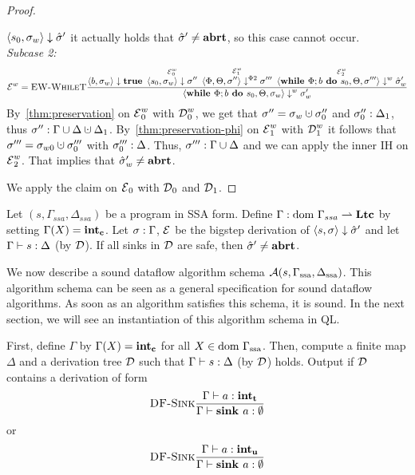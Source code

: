 \begin{proof}
\begin{claimproof}
        $\langle s_0, \sigma_w \rangle \downarrow \hat{\sigma}{}'$ it actually holds that $\hat{\sigma}{}' \neq \textbf{abrt}$,
        so this case cannot occur.\\
        \emph{Subcase 2:}
        \begin{align*}
            \operatorname{\mathcal{E}}^w = \textsc{EW-WhileT}\frac{\displaystyle \overset{}{\langle b, \sigma_w \rangle \downarrow \textbf{true}} \enskip
            \overset{\operatorname{\mathcal{E}}^w_0}{\langle s_0, \sigma_w \rangle \downarrow \sigma''} \enskip
            \overset{\operatorname{\mathcal{E}}^w_1}{\langle \Phi, \Theta, \sigma'' \rangle \downarrow^{\Phi2} \sigma'''} \enskip
            \overset{\operatorname{\mathcal{E}}^w_2}{\langle \textbf{while }\Phi;{b} \textbf{ do } {s_0}, \Theta, \sigma''' \rangle \downarrow^w \hat{\sigma}'_w}}{\displaystyle \langle \textbf{while }\Phi;{b} \textbf{ do } {s_0}, \Theta, \sigma_w \rangle \downarrow^w \sigma_w'}
        \end{align*}
        By~\autoref{thm:preservation} on $\operatorname{\mathcal{E}}^w_0$ with $\operatorname{\mathcal{D}}^w_0$, we get that $\store'' = \store_w \dunion \store''_0$
        and ${\sigma''_0}:{\Delta_1}$, thus $\matches{\store''}{\Gamma \union \Delta \dunion \Delta_1}$.
        By~\autoref{thm:preservation-phi} on $\operatorname{\mathcal{E}}^w_1$ with $\operatorname{\mathcal{D}}_1^w$ it follows that $\store''' = \store_{w0} \dunion \store'''_0$
        with ${\sigma'''_0}:{\Delta}$.
        Thus, ${\sigma'''}:{\Gamma \cup \Delta}$ and we can apply the inner IH on $\operatorname{\mathcal{E}}^w_2$.
        That implies that $\hat{\sigma}{}'_w \neq \textbf{abrt}$.
    \end{claimproof}
    We apply the claim on $\operatorname{\mathcal{E}}_0$ with $\operatorname{\mathcal{D}}_0$ and $\operatorname{\mathcal{D}}_1$.
\end{proof}

\begin{corollary}
    \label{cor:soundness-df}
    Let $(s, \Gamma_{ssa}, \Delta_{ssa})$ be a program in SSA form.
    Define $\Gamma: \text{dom }{\Gamma}_{ssa} \rightharpoonup \textbf{Ltc}$ by setting
    $\Gamma(X) = \textbf{int}_\textbf{c}$.
    Let $\sigma : \Gamma$, $\operatorname{\mathcal{E}}$ be the bigstep derivation of 
    $\langle s, \sigma \rangle \downarrow \hat{\sigma}{}'$
    and let $\Gamma \vdash {s}: \Delta$ (by $\operatorname{\mathcal{D}}$).
    If all sinks in $\operatorname{\mathcal{D}}$ are safe, then $\hat{\sigma}{}' \neq \textbf{abrt}$.
\end{corollary}

We now describe a sound dataflow algorithm schema $\operatorname{\mathcal{A}}(s, \Gamma_\text{ssa}, \Delta_\text{ssa})$.
This algorithm schema can be seen as a general specification for sound dataflow algorithms.
As soon as an algorithm satisfies this schema, it is sound.
In the next section, we will see an instantiation of this algorithm schema in QL.

First, define $\Gamma$ by $\Gamma(X) = \textbf{int}_\textbf{c}$ for all $X \in \text{dom }{\Gamma}_\text{ssa}$.
Then, compute a finite map $\Delta$ and a derivation tree $\operatorname{\mathcal{D}}$ 
such that $\Gamma \vdash {s}: \Delta$ (by $\operatorname{\mathcal{D}}$) holds.
Output  if $\operatorname{\mathcal{D}}$ contains a derivation of form
\begin{equation*}
    \textsc{DF-Sink}\frac{\displaystyle \Gamma \vdash {a}: \textbf{int}_\textbf{t}}{\displaystyle \Gamma \vdash {\textbf{sink }{a}}: \emptyset}
\end{equation*}
or
\begin{equation*}
    \textsc{DF-Sink}\frac{\displaystyle \Gamma \vdash {a}: \textbf{int}_\textbf{u}}{\displaystyle \Gamma \vdash {\textbf{sink }{a}}: \emptyset}
\end{equation*}

